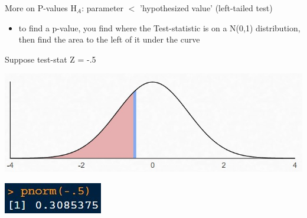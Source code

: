 \documentclass{beamer}
\begin{document}
\begin{frame}{More on P-values}
H$_A$: parameter $<$ 'hypothesized value' (left-tailed test)
\begin{itemize}
    \item to find a p-value, you find where the Test-statistic is on a N(0,1) distribution, then find the area to the left of it under the curve
\end{itemize} \vspace{2mm}

Suppose test-stat Z = -.5
\begin{center}
    \includegraphics[scale=.7]{img/standardnormal_pvalue2.jpg}

    \includegraphics[scale=1]{img/Rpval2.jpg}
\end{center}
\end{frame}
\end{document}
